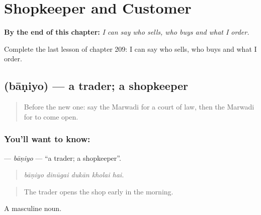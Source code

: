 
\chapter{Shopkeeper and Customer}
\label{ch:mw-shopkeeper-and-customer}

\begin{chapteropening}
\textbf{By the end of this chapter:} \emph{I can say who sells, who buys and what I order.}

Complete the last lesson of chapter 209: I can say who sells, who buys and what I order.
\end{chapteropening}

\section[\texorpdfstring{\mw{बाणियो} (bāṇiyo)}{बाणियो (bāṇiyo)}]{ (bāṇiyo) — a trader; a shopkeeper}

\label{lesson:MW-C209-baniyo}



\begin{quote}
Before the new one: say the Marwadi for a court of law, then the Marwadi for to come open.
\end{quote}

\subsection*{You'll want to know: }
\textbf{} — \emph{bāṇiyo} — \textquotedblleft{}a trader; a shopkeeper\textquotedblright{}.

\begin{quote}
    
\end{quote}

\begin{quote}
\emph{bāṇiyo dinūgai dukān kholai hai.}
\end{quote}

\begin{quote}
The trader opens the shop early in the morning.
\end{quote}

A masculine noun.

